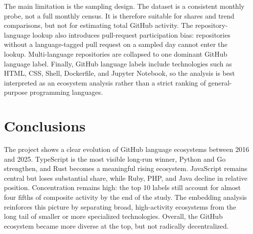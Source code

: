 \documentclass[11pt,a4paper]{article}
\begin{document}
The main limitation is the sampling design. The dataset is a consistent monthly probe, not a full monthly census. It is therefore suitable for shares and trend comparisons, but not for estimating total GitHub activity. The repository-language lookup also introduces pull-request participation bias: repositories without a language-tagged pull request on a sampled day cannot enter the lookup. Multi-language repositories are collapsed to one dominant GitHub language label. Finally, GitHub language labels include technologies such as HTML, CSS, Shell, Dockerfile, and Jupyter Notebook, so the analysis is best interpreted as an ecosystem analysis rather than a strict ranking of general-purpose programming languages.

\section{Conclusions}

The project shows a clear evolution of GitHub language ecosystems between 2016 and 2025. TypeScript is the most visible long-run winner, Python and Go strengthen, and Rust becomes a meaningful rising ecosystem. JavaScript remains central but loses substantial share, while Ruby, PHP, and Java decline in relative position. Concentration remains high: the top 10 labels still account for almost four fifths of composite activity by the end of the study. The embedding analysis reinforces this picture by separating broad, high-activity ecosystems from the long tail of smaller or more specialized technologies. Overall, the GitHub ecosystem became more diverse at the top, but not radically decentralized.
\end{document}
